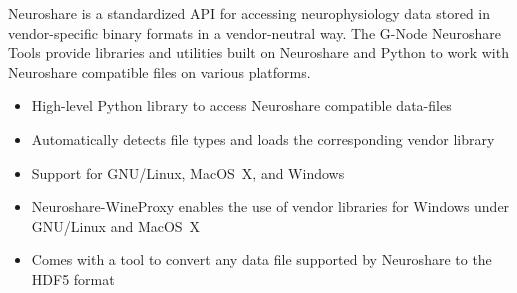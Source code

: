 \begin{multicols}{3}
% 
% 



Neuroshare is a standardized API for accessing neurophysiology
data stored in vendor-specific binary formats in a vendor-neutral
way. The G-Node Neuroshare Tools provide libraries and utilities
built on Neuroshare and Python to work with Neuroshare compatible
files on various platforms.

\begin{itemize}[nolistsep,topsep=0em,leftmargin=1pc]
\item High-level Python library to access Neuroshare compatible data-files
\item Automatically detects file types and loads the corresponding vendor library
\item Support for GNU/Linux, MacOS~X, and Windows
\item Neuroshare-WineProxy enables the use of vendor libraries for Windows under GNU/Linux and MacOS~X
\item Comes with a tool to convert any data file supported by Neuroshare to the HDF5 format
\end{itemize}


\end{multicols}
